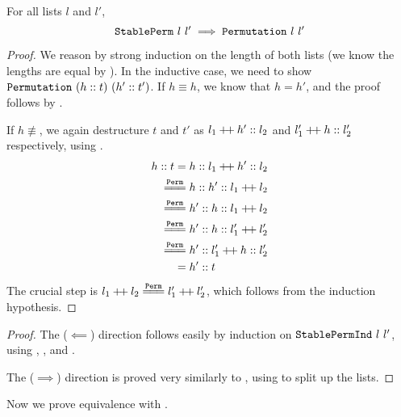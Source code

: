 \documentclass[sigplan,10pt,anonymous,review]{thesis}
\begin{document}
\begin{theorem}
  For all lists $l$ and $l'$,
  \begin{equation*}
    \texttt{\textup{StablePerm}}~l~l' \implies \texttt{\textup{Permutation}}~l~l'
  \end{equation*}
\end{theorem}
\begin{proof}
  We reason by strong induction on the length of both lists (we know
  the lengths are equal by ). In the inductive
  case, we need to show $\texttt{\textup{Permutation}}~(h :: t)~(h' :: t')$. If $h
  \equiv h$, we know that $h = h'$, and the proof follows by
  .

  If $h \not\equiv$, we again destructure $t$ and $t'$ as $l_1 \mathbin{+\mkern-3mu+} h' ::
  l_2$ and $l_1' \mathbin{+\mkern-3mu+} h :: l_2'$ respectively, using
  .
  \begin{align*}
    h::t ={}& h :: l_1 \dplus h' :: l_2 \\
    \eqperm{}& h :: h' :: l_1 \dplus l_2 \\
    \eqperm{}& h' :: h :: l_1 \dplus l_2 \\
    \eqperm{}& h' :: h :: l_1' \dplus l_2' \\
    \eqperm{}& h' :: l_1' \dplus h :: l_2' \\
    ={}& h'::t
  \end{align*}
  The crucial step is $l_1 \dplus l_2 \eqperm l_1' \dplus l_2'$, which
  follows from the induction hypothesis.
\end{proof}

\stablepermindiff*
\begin{proof}
  The ($\impliedby$) direction follows easily by induction on
  $\texttt{\textup{StablePermInd}}~l~l'$, using ,
  , and .

  The ($\implies$) direction is proved very similarly to
  , using  to split up
  the lists.
\end{proof}

Now we prove equivalence with .
\end{document}
